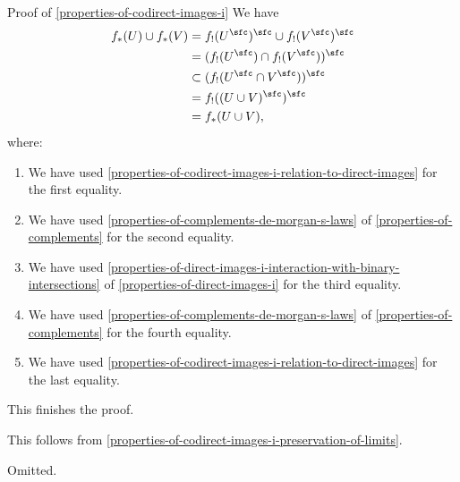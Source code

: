 \begin{Proof}{Proof of \cref{properties-of-codirect-images-i}}
    We have
    \begin{align*}
        f_{*}(U)\cup f_{*}(V) &=       f_{!}(U^{\sfc})^{\sfc}\cup f_{!}(V^{\sfc})^{\sfc}\\
                              &=       (f_{!}(U^{\sfc})\cap f_{!}(V^{\sfc}))^{\sfc}\\
                              &\subset (f_{!}(U^{\sfc}\cap V^{\sfc}))^{\sfc}\\
                              &=       f_{!}((U\cup V)^{\sfc})^{\sfc}\\
                              &=       f_{*}(U\cup V),
    \end{align*}
    where:
    \begin{enumerate}
        \item\label{proof-of-properties-of-codirect-images-i-interaction-with-binary-unions-1}We have used \cref{properties-of-codirect-images-i-relation-to-direct-images} for the first equality.
        \item\label{proof-of-properties-of-codirect-images-i-interaction-with-binary-unions-2}We have used \cref{properties-of-complements-de-morgan-s-laws} of \cref{properties-of-complements} for the second equality.
        \item\label{proof-of-properties-of-codirect-images-i-interaction-with-binary-unions-3}We have used \cref{properties-of-direct-images-i-interaction-with-binary-intersections} of \cref{properties-of-direct-images-i} for the third equality.
        \item\label{proof-of-properties-of-codirect-images-i-interaction-with-binary-unions-4}We have used \cref{properties-of-complements-de-morgan-s-laws} of \cref{properties-of-complements} for the fourth equality.
        \item\label{proof-of-properties-of-codirect-images-i-interaction-with-binary-unions-5}We have used \cref{properties-of-codirect-images-i-relation-to-direct-images} for the last equality.
    \end{enumerate}
    This finishes the proof.

    This follows from \cref{properties-of-codirect-images-i-preservation-of-limits}.

    Omitted.


\end{Proof}
